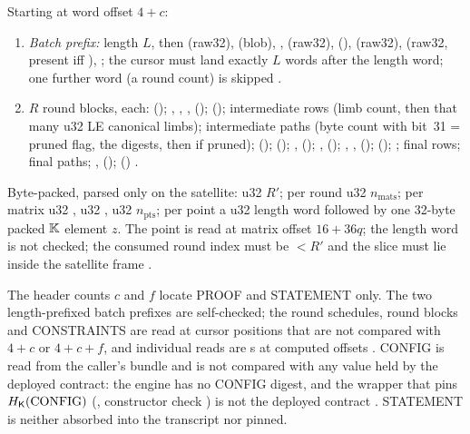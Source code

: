 \begin{definition}
\label{def:sv-proof}
Starting at word offset $4+c$:
\begin{enumerate}
\item \emph{Batch prefix:} length $L$, then  (raw32),
   (blob), ,  (raw32),
   (),  (raw32),
   (raw32, present iff ), ; the cursor
  must land exactly $L$ words after the length word; one further word (a round
  count) is skipped .
\item $R$ round blocks, each:  ();
  , , , 
  ();  (); intermediate rows (limb count,
  then that many u32 LE canonical limbs); intermediate paths (byte count with
  bit~31 = pruned flag, the digests, then  if pruned);
   ();  ();
  ,  (); , 
  (); , ,  ();
   (); ; final rows; final
  paths; ,  (); 
  () .
\end{enumerate}
\end{definition}

\begin{definition}
\label{def:sv-stm}
Byte-packed, parsed only on the satellite: u32 $R'$; per round u32
$n_{\mathrm{mats}}$; per matrix u32 , u32 , u32
$n_{\mathrm{pts}}$; per point a u32 length word followed by one 32-byte packed
$\mathbb{K}$ element $z$. The point is read at matrix offset $16 + 36q$; the length word
is not checked; the consumed round index must be $< R'$ and the slice must lie
inside the satellite frame .
\end{definition}

\begin{property}
\label{prop:sv-sections}
The header counts $c$ and $f$ locate PROOF and STATEMENT only. The two
length-prefixed batch prefixes are self-checked; the round schedules, round
blocks and CONSTRAINTS are read at cursor positions that are not compared with
$4+c$ or $4+c+f$, and individual reads are s at computed
offsets . CONFIG is read from the caller's
bundle and is not compared with any value held by the deployed contract: the
engine has no CONFIG digest, and the wrapper that pins
$H_{\mathsf{K}}(\text{CONFIG})$ (, constructor check
) is not the deployed contract
 . STATEMENT is neither
absorbed into the transcript nor pinned.
\end{property}

